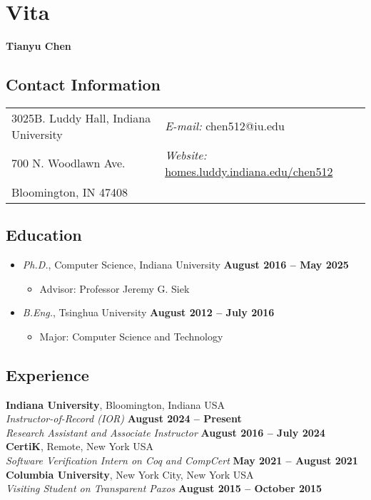 \chapter*{Vita}

\doublespacing


\textbf{\Huge Tianyu Chen}


\section*{\sc Contact Information}
\vspace{.05in}
\begin{tabular}{@{}p{3in}p{3in}}
  3025B. Luddy Hall, Indiana University        & {\it E-mail:} chen512@iu.edu                          \\
  700 N. Woodlawn Ave.    & {\it Website:} \href{https://homes.luddy.indiana.edu/chen512/}{homes.luddy.indiana.edu/chen512}  \\
  Bloomington, IN 47408   &
\end{tabular}


\section*{\sc Education}

\begin{itemize}
\item {\em Ph.D.}, Computer Science, Indiana University \hfill {\bf August 2016 -- May 2025}
  \begin{itemize}
    \item Advisor: Professor Jeremy G. Siek
  \end{itemize}
\item {\em B.Eng.}, Tsinghua University \hfill {\bf August 2012 -- July 2016}
  \begin{itemize}
  \item Major: Computer Science and Technology
  \end{itemize}
\end{itemize}


\section*{\sc Experience}

{\bf Indiana University}, Bloomington, Indiana USA \\
{\em Instructor-of-Record (IOR)} \hfill {\bf August 2024 -- Present} \\
{\em Research Assistant and Associate Instructor} \hfill {\bf August 2016 -- July 2024} \\
{\bf CertiK}, Remote, New York USA \\
{\em Software Verification Intern on Coq and CompCert} \hfill {\bf May 2021 -- August 2021} \\
{\bf Columbia University}, New York City, New York USA \\
{\em Visiting Student on Transparent Paxos} \hfill {\bf August 2015 -- October 2015} \\


